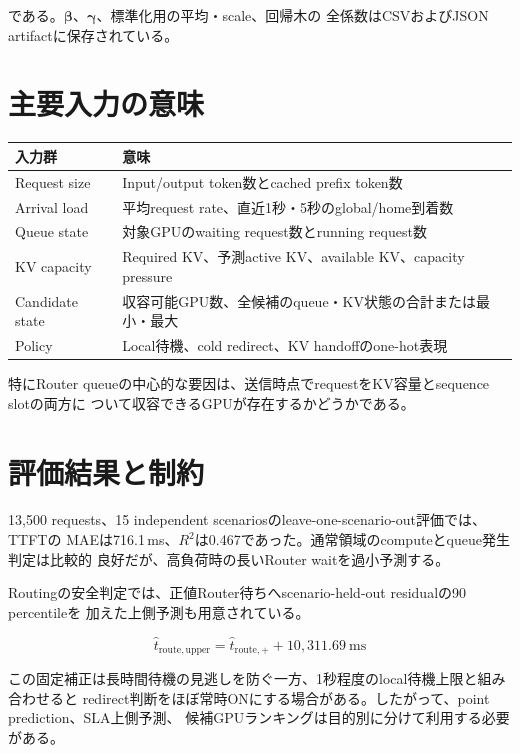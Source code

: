\documentclass[a4paper,11pt]{ltjsarticle}
\begin{document}
である。$\boldsymbol{\beta}$、$\boldsymbol{\gamma}$、標準化用の平均・scale、回帰木の
全係数はCSVおよびJSON artifactに保存されている。

\section{主要入力の意味}

\begin{center}
\begin{tabular}{lp{88mm}}
\toprule
入力群 & 意味 \\
\midrule
Request size & Input/output token数とcached prefix token数 \\
Arrival load & 平均request rate、直近1秒・5秒のglobal/home到着数 \\
Queue state & 対象GPUのwaiting request数とrunning request数 \\
KV capacity & Required KV、予測active KV、available KV、capacity pressure \\
Candidate state & 収容可能GPU数、全候補のqueue・KV状態の合計または最小・最大 \\
Policy & Local待機、cold redirect、KV handoffのone-hot表現 \\
\bottomrule
\end{tabular}
\end{center}

特にRouter queueの中心的な要因は、送信時点でrequestをKV容量とsequence slotの両方に
ついて収容できるGPUが存在するかどうかである。

\section{評価結果と制約}

13,500 requests、15 independent scenariosのleave-one-scenario-out評価では、TTFTの
MAEは716.1\,ms、$R^2$は0.467であった。通常領域のcomputeとqueue発生判定は比較的
良好だが、高負荷時の長いRouter waitを過小予測する。

Routingの安全判定では、正値Router待ちへscenario-held-out residualの90 percentileを
加えた上側予測も用意されている。

\begin{equation}
\hat{t}_{\mathrm{route,upper}}
=
\hat{t}_{\mathrm{route},+}
+10{,}311.69\ \mathrm{ms}
\end{equation}

この固定補正は長時間待機の見逃しを防ぐ一方、1秒程度のlocal待機上限と組み合わせると
redirect判断をほぼ常時ONにする場合がある。したがって、point prediction、SLA上側予測、
候補GPUランキングは目的別に分けて利用する必要がある。
\end{document}
